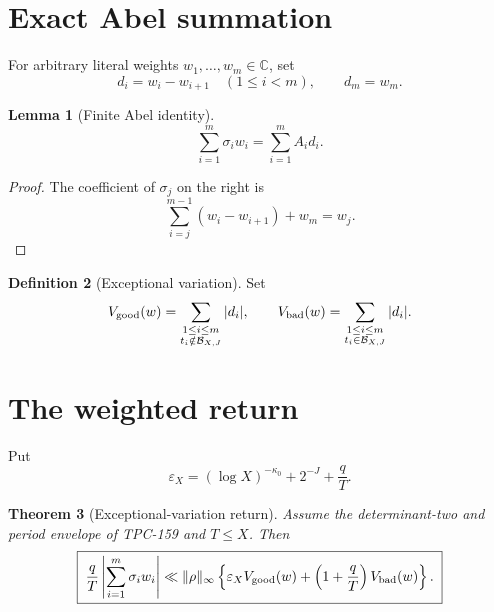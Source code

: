\documentclass[11pt]{article}
\newtheorem{theorem}{Theorem}[section]
\newtheorem{lemma}[theorem]{Lemma}
\theoremstyle{definition}
\newtheorem{definition}[theorem]{Definition}
\newcommand{\Bbad}{\mathcal B}
\newcommand{\norm}[1]{\lVert#1\rVert}
\begin{document}
\section{Exact Abel summation}

For arbitrary literal weights \(w_1,\ldots,w_m\in\mathbb C\), set
\begin{equation}
 d_i=w_i-w_{i+1}\quad(1\le i<m),\qquad d_m=w_m.
\label{eq:difference}
\end{equation}

\begin{lemma}[Finite Abel identity]\label{lem:abel}
\begin{equation}
 \sum_{i=1}^m\sigma_iw_i=\sum_{i=1}^mA_id_i.
\label{eq:abel}
\end{equation}
\end{lemma}

\begin{proof}
The coefficient of \(\sigma_j\) on the right is
\[
 \sum_{i=j}^{m-1}(w_i-w_{i+1})+w_m=w_j.
\]
\end{proof}

\begin{definition}[Exceptional variation]\label{def:variation}
Set
\[
 V_{\rm good}(w)=
 \sum_{\substack{1\le i\le m\\t_i\notin\Bbad_{X,J}}}|d_i|,
 \qquad
 V_{\rm bad}(w)=
 \sum_{\substack{1\le i\le m\\t_i\in\Bbad_{X,J}}}|d_i|.
\]
\end{definition}

\section{The weighted return}

Put
\begin{equation}
 \varepsilon_X=(\log X)^{-\kappa_0}+2^{-J}+\frac qT.
\label{eq:epsilon}
\end{equation}

\begin{theorem}[Exceptional-variation return]\label{thm:main}
Assume the determinant-two and period envelope of TPC-159 and
\(T\le X\).  Then
\begin{equation}
 \boxed{\;
 \frac qT\left|\sum_{i=1}^m\sigma_iw_i\right|
 \ll\norm{\rho}_\infty
 \left\{
 \varepsilon_XV_{\rm good}(w)
 +\left(1+\frac qT\right)V_{\rm bad}(w)
 \right\}.\;}
\label{eq:main}
\end{equation}
\end{theorem}
\end{document}
